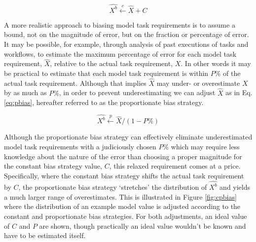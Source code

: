 \documentclass[10pt]{csce}
\begin{document}
\begin{equation}
\hat{X^b} \xleftarrow{c} \hat{X} + C
\label{eq:cbias}
\end{equation}

A more realistic approach to biasing model task requirements is to assume a
bound, not on the magnitude of error, but on the fraction or percentage of
error. It may be possible, for example, through analysis of past executions of
tasks and workflows, to estimate the maximum percentage of error for each model
task requirement, $\hat{X}$, relative to the actual task requirement, $X$. In
other words it may be practical to estimate that each model task requirement is
within $P\%$ of the actual task requirement.  Although that implies $\hat{X}$
may under- or overestimate $X$ by as much as $P\%$, in order to prevent
underestimating we can adjust $\hat{X}$ as in Eq. \ref{eq:pbias}, hereafter
referred to as the proportionate bias strategy.

\begin{equation}
\hat{X^b} \xleftarrow{p} \hat{X} / (1 - P\%)
\label{eq:pbias}
\end{equation}

Although the proportionate bias strategy can effectively eliminate
underestimated model task requirements with a judiciously chosen $P\%$
which may require less knowledge about the nature of the error than choosing
a proper magnitude for the constant bias strategy value, $C$, this relaxed
requirement comes at a price. Specifically, where the constant bias
strategy shifts the actual task requirement by $C$, the proportionate bias
strategy `stretches' the distribution of $\hat{X^b}$ and yields a much larger
range of overestimates. This is illustrated in Figure \ref{fig:cpbias} where
the distribution of an example model value is adjusted according to the
constant and proportionate bias strategies.  For both adjustments, an ideal
value of $C$ and $P$ are shown, though practically an ideal value wouldn't be
known and have to be estimated itself.
\end{document}
